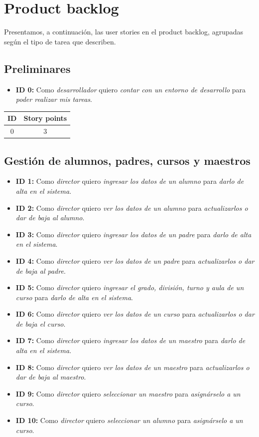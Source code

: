 \documentclass[a4paper, 10pt, twoside]{article}
\newenvironment{stories}{
  \begin{itemize}
}{
  \end{itemize}
}
\newcommand{\story}[4]{
  \item
  \textbf{ID #1:} Como \emph{#2} quiero \emph{#3} para \emph{#4}.
}
\begin{document}


\newpage
\section{Product backlog}

Presentamos, a continuación, las user stories en el product backlog, agrupadas según el tipo de tarea que describen.


\subsection{Preliminares}

\begin{stories}
  \story{0}{desarrollador}
        {contar con un entorno de desarrollo}
        {poder realizar mis tareas}
\end{stories}

\begin{center}
\begin{tabular}{|c|c|}
\hline
ID & Story points\\
\hline
0  & 3\\
\hline
\end{tabular}
\end{center}


\subsection{Gestión de alumnos, padres, cursos y maestros}

\begin{stories}
  \story{1}{director}
        {ingresar los datos de un alumno}
        {darlo de alta en el sistema}

  \story{2}{director}
        {ver los datos de un alumno}
        {actualizarlos o dar de baja al alumno}

  \story{3}{director}
        {ingresar los datos de un padre}
        {darlo de alta en el sistema}

  \story{4}{director}
        {ver los datos de un padre}
        {actualizarlos o dar de baja al padre}

  \story{5}{director}
        {ingresar el grado, división, turno y aula de un curso}
        {darlo de alta en el sistema}

  \story{6}{director}
        {ver los datos de un curso}
        {actualizarlos o dar de baja el curso}

  \story{7}{director}
        {ingresar los datos de un maestro}
        {darlo de alta en el sistema}

  \story{8}{director}
        {ver los datos de un maestro}
        {actualizarlos o dar de baja al maestro}

  \story{9}{director}
        {seleccionar un maestro}
        {asignárselo a un curso}

  \story{10}{director}
        {seleccionar un alumno}
        {asignárselo a un curso}
\end{stories}
\end{document}

